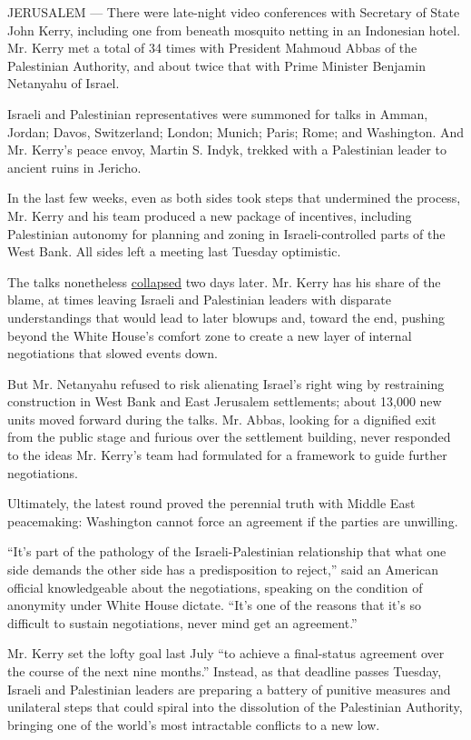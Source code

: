 JERUSALEM --- There were late-night video conferences with Secretary of
State John Kerry, including one from beneath mosquito netting in an
Indonesian hotel. Mr. Kerry met a total of 34 times with President
Mahmoud Abbas of the Palestinian Authority, and about twice that with
Prime Minister Benjamin Netanyahu of Israel.

Israeli and Palestinian representatives were summoned for talks in
Amman, Jordan; Davos, Switzerland; London; Munich; Paris; Rome; and
Washington. And Mr. Kerry's peace envoy, Martin S. Indyk, trekked with a
Palestinian leader to ancient ruins in Jericho.

In the last few weeks, even as both sides took steps that undermined the
process, Mr. Kerry and his team produced a new package of incentives,
including Palestinian autonomy for planning and zoning in
Israeli-controlled parts of the West Bank. All sides left a meeting last
Tuesday optimistic.

The talks nonetheless
\href{http://www.nytimes3xbfgragh.onion/2014/04/26/world/middleeast/collapse-of-peace-talks-leaves-israel-in-precarious-position.html?hpw\&rref=world}{collapsed}
two days later. Mr. Kerry has his share of the blame, at times leaving
Israeli and Palestinian leaders with disparate understandings that would
lead to later blowups and, toward the end, pushing beyond the White
House's comfort zone to create a new layer of internal negotiations that
slowed events down.

But Mr. Netanyahu refused to risk alienating Israel's right wing by
restraining construction in West Bank and East Jerusalem settlements;
about 13,000 new units moved forward during the talks. Mr. Abbas,
looking for a dignified exit from the public stage and furious over the
settlement building, never responded to the ideas Mr. Kerry's team had
formulated for a framework to guide further negotiations.

Ultimately, the latest round proved the perennial truth with Middle East
peacemaking: Washington cannot force an agreement if the parties are
unwilling.

``It's part of the pathology of the Israeli-Palestinian relationship
that what one side demands the other side has a predisposition to
reject,'' said an American official knowledgeable about the
negotiations, speaking on the condition of anonymity under White House
dictate. ``It's one of the reasons that it's so difficult to sustain
negotiations, never mind get an agreement.''

Mr. Kerry set the lofty goal last July ``to achieve a final-status
agreement over the course of the next nine months.'' Instead, as that
deadline passes Tuesday, Israeli and Palestinian leaders are preparing a
battery of punitive measures and unilateral steps that could spiral into
the dissolution of the Palestinian Authority, bringing one of the
world's most intractable conflicts to a new low.

